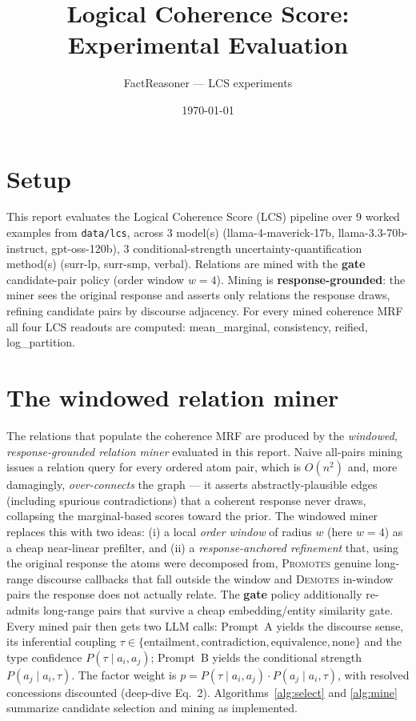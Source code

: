 \documentclass[11pt]{article}
\title{Logical Coherence Score: Experimental Evaluation}
\author{FactReasoner --- LCS experiments}
\date{\today}
\begin{document}
\maketitle

\section{Setup}

This report evaluates the Logical Coherence Score (LCS) pipeline over 9 worked examples from \texttt{data/lcs}, across 3 model(s) (llama-4-maverick-17b, llama-3.3-70b-instruct, gpt-oss-120b), 3 conditional-strength uncertainty-quantification method(s) (surr-lp, surr-smp, verbal). Relations are mined with the \textbf{gate} candidate-pair policy (order window $w=4$). Mining is \textbf{response-grounded}: the miner sees the original response and asserts only relations the response draws, refining candidate pairs by discourse adjacency. For every mined coherence MRF all four LCS readouts are computed: mean\_marginal, consistency, reified, log\_partition.

\section{The windowed relation miner}
\label{sec:algorithm}

The relations that populate the coherence MRF are produced by the \emph{windowed,
response-grounded relation miner} evaluated in this report. Naive all-pairs mining
issues a relation query for every ordered atom pair, which is $O(n^2)$ and, more
damagingly, \emph{over-connects} the graph --- it asserts abstractly-plausible edges
(including spurious contradictions) that a coherent response never draws, collapsing
the marginal-based scores toward the prior. The windowed miner replaces this with two
ideas: (i) a local \emph{order window} of radius $w$ (here $w{=}4$) as a cheap
near-linear prefilter, and (ii) a \emph{response-anchored refinement} that, using the
original response the atoms were decomposed from, \textsc{Promotes} genuine long-range
discourse callbacks that fall outside the window and \textsc{Demotes} in-window pairs
the response does not actually relate. The \textbf{gate} policy additionally re-admits
long-range pairs that survive a cheap embedding/entity similarity gate. Every mined
pair then gets two LLM calls: Prompt~A yields the discourse sense, its inferential
coupling $\tau\in\{\text{entailment},\text{contradiction},\text{equivalence},
\text{none}\}$ and the type confidence $P(\tau\mid a_i,a_j)$; Prompt~B yields the
conditional strength $P(a_j\mid a_i,\tau)$. The factor weight is
$p = P(\tau\mid a_i,a_j)\cdot P(a_j\mid a_i,\tau)$, with resolved concessions
discounted (deep-dive Eq.~2). Algorithms~\ref{alg:select} and \ref{alg:mine}
summarize candidate selection and mining as implemented.
\end{document}
